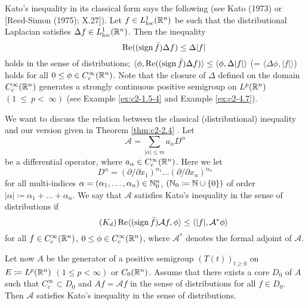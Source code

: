 \begin{example}\label{ex:c2-2.5}
Kato's inequality in its classical form says the following (see Kato (1973) or [Reed-Simon (1975); X.27]).
Let $f \in L^1_{\text{loc}}(\mathbb{R}^n)$ be such that the distributional Laplacian satisfies $\Delta f \in L^1_{\text{loc}}(\mathbb{R}^n)$.
Then the inequality
\begin{equation*} \label{eq:c2-K-classic} \tag*{}
\mathop{}\!\mathrm{Re}((\operatorname{sign} \bar{f})\Delta f) \leq \Delta|f| 
\end{equation*}
holds in the sense of distributions; \ie
$\langle \phi, \mathop{}\!\mathrm{Re}((\operatorname{sign} \bar{f})\Delta f) \rangle \leq \langle \phi,\Delta|f| \rangle$ (= $\langle \Delta \phi,|f| \rangle$) holds for all $0 \leq \phi \in C_{c}^{\infty}(\mathbb{R}^n)$.
Note that the closure of $\Delta$ defined on the domain $C_{c}^{\infty}(\mathbb{R}^n)$ generates a strongly continuous positive semigroup on $L^p(\mathbb{R}^n)$ $(1~\leq~p <~\infty)$ (see Example \ref{ex:c2-1.5-4} and Example \ref{ex:c2-4.7}).
\end{example}
We want to discuss the relation between the classical (distributional) inequality and our version given in Theorem \ref{thm:c2-2.4} .
Let 
\[
\mathcal{A} = \sum_{|\alpha| \leq m} a_{\alpha} D^{\alpha}
\]
be a differential operator, where $a_{\alpha} \in C_{c}^{\infty}(\mathbb{R}^n)$.
Here we let 
\[
D^{\alpha} = (\partial/\partial x_1)^{\alpha_1} \ldots (\partial/\partial x_{n})^{\alpha_{n}}
\]
for all multi-indices $\alpha = (\alpha_1,\ldots,\alpha_{n}) \in \mathbb{N}_{0}^n$, 
$(\mathbb{N}_{0} \coloneqq \mathbb{N}\cup\{0\})$ of order $|\alpha| \coloneqq \alpha_1 + \ldots + \alpha_{n}$.
We say that $\mathcal{A}$ satisfies Kato's inequality in the sense of distributions if
\begin{equation}\label{eq:c2-Kd} \tag{$K_{d}$}
\Re\langle(\sign \bar{f})\mathcal{A}f, \phi \rangle \leq \langle|f|, \mathcal{A}^{*}\phi \rangle
\end{equation}
for all $f \in C_{c}^{\infty}(\mathbb{R}^n)$, $0 \leq \phi \in C_{c}^{\infty}(\mathbb{R}^n)$, where $\mathcal{A}^{*}$ denotes the formal adjoint of $\mathcal{A}$. 

Let now $A$ be the generator of a positive semigroup $(T(t))_{t \geq 0}$ on $E \coloneqq L^p(\mathbb{R}^n)$ $(1 \leq p < \infty)$ or $C_{0}(\mathbb{R}^n)$.
Assume that there exists a core
$D_{0}$ of $A$ such that $C_{c}^{\infty} \subset D_{0}$ and $Af = \mathcal{A}f$ in the sense of distributions for all $f \in D_{0}$.
Then $\mathcal{A}$ satisfies Kato's inequality in the sense of distributions.

